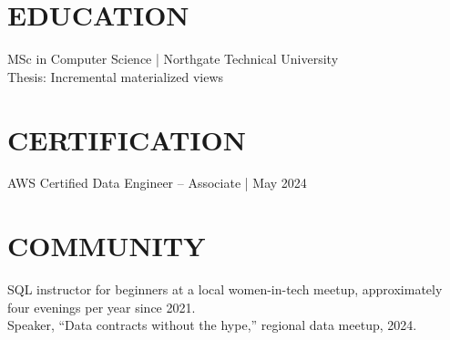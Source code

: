 \documentclass[11pt,a4paper]{article}
\begin{document}
\section*{EDUCATION}
MSc in Computer Science | Northgate Technical University\\
Thesis: Incremental materialized views

\section*{CERTIFICATION}
AWS Certified Data Engineer -- Associate | May 2024

\section*{COMMUNITY}
SQL instructor for beginners at a local women-in-tech meetup, approximately four evenings per year since 2021.\\
Speaker, “Data contracts without the hype,” regional data meetup, 2024.
\end{document}
